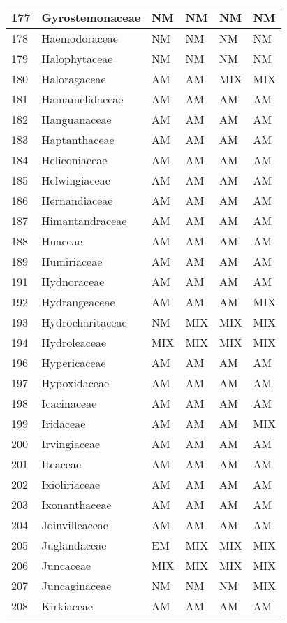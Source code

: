 \documentclass[]{article}
\begin{document}
\begin{longtable}{l|l|l|l|l|l}
\hline
177 & Gyrostemonaceae & NM & NM & NM & NM\\
\hline
178 & Haemodoraceae & NM & NM & NM & NM\\
\hline
179 & Halophytaceae & NM & NM & NM & NM\\
\hline
180 & Haloragaceae & AM & AM & MIX & MIX\\
\hline
181 & Hamamelidaceae & AM & AM & AM & AM\\
\hline
182 & Hanguanaceae & AM & AM & AM & AM\\
\hline
183 & Haptanthaceae & AM & AM & AM & AM\\
\hline
184 & Heliconiaceae & AM & AM & AM & AM\\
\hline
185 & Helwingiaceae & AM & AM & AM & AM\\
\hline
186 & Hernandiaceae & AM & AM & AM & AM\\
\hline
187 & Himantandraceae & AM & AM & AM & AM\\
\hline
188 & Huaceae & AM & AM & AM & AM\\
\hline
189 & Humiriaceae & AM & AM & AM & AM\\
\hline
191 & Hydnoraceae & AM & AM & AM & AM\\
\hline
192 & Hydrangeaceae & AM & AM & AM & MIX\\
\hline
193 & Hydrocharitaceae & NM & MIX & MIX & MIX\\
\hline
194 & Hydroleaceae & MIX & MIX & MIX & MIX\\
\hline
196 & Hypericaceae & AM & AM & AM & AM\\
\hline
197 & Hypoxidaceae & AM & AM & AM & AM\\
\hline
198 & Icacinaceae & AM & AM & AM & AM\\
\hline
199 & Iridaceae & AM & AM & AM & MIX\\
\hline
200 & Irvingiaceae & AM & AM & AM & AM\\
\hline
201 & Iteaceae & AM & AM & AM & AM\\
\hline
202 & Ixioliriaceae & AM & AM & AM & AM\\
\hline
203 & Ixonanthaceae & AM & AM & AM & AM\\
\hline
204 & Joinvilleaceae & AM & AM & AM & AM\\
\hline
205 & Juglandaceae & EM & MIX & MIX & MIX\\
\hline
206 & Juncaceae & MIX & MIX & MIX & MIX\\
\hline
207 & Juncaginaceae & NM & NM & NM & MIX\\
\hline
208 & Kirkiaceae & AM & AM & AM & AM\\

\end{longtable}
\end{document}
